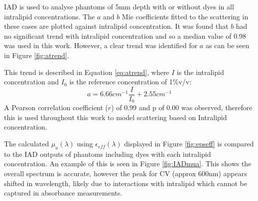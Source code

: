 IAD\cite{Prahl2017} is used to analyse phantoms of 5mm depth with or without dyes in all intralipid concentrations. The $a$ and $b$ Mie coefficients fitted to the scattering in these cases are plotted against intralipid concentration. It was found that $b$ had no significant trend with intralipid concentration and so a median value of 0.98 was used in this work.
However, a clear trend was identified for $a$ as can be seen in Figure \ref{fig:atrend}. 

This trend is described in Equation \eqref{eq:atrend}, where $I$ is the intralipid concentration and $I_0$ is the reference concentration of 1\%v/v: 
\begin{equation}
    a = 6.66cm^{-1}\frac{I}{I_0} + 2.55cm^{-1}
    \label{eq:atrend}
\end{equation}
A Pearson correlation coefficient ($r$) of 0.99 and p of 0.00 was observed, therefore this is used throughout this work to model scattering based on Intralipid concentration.

The calculated $\mu_a(\lambda)$ using $\epsilon_{eff}(\lambda)$ displayed in Figure \ref{fig:epseff} is compared to the IAD outputs of phantoms including dyes with each intralipid concentration.
An example of this is seen in Figure \ref{fig:IADmua}. This shows the overall spectrum is accurate, however the peak for CV (approx 600nm) appears shifted in wavelength, likely due to interactions with intralipid which cannot be captured in absorbance measurements. 

